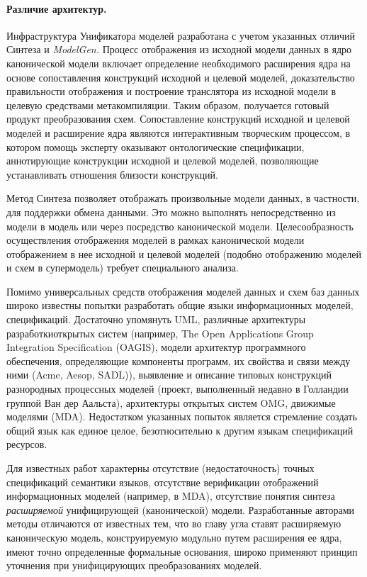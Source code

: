 \begin{multicols}{2}
\paragraph*{Различие архитектур.}Инфраструктура Унификатора моделей
разработана с учетом указанных отличий Синтеза и {\em ModelGen.}
Процесс отображения из исходной модели данных в ядро канонической
модели включает определение необходимого расширения ядра на основе
сопоставления конструкций исходной и целевой моделей, доказательство
правильности отображения и построение транслятора из исходной модели в
целевую средствами метакомпиляции. Таким образом, получается готовый
продукт преобразования схем. Сопоставление конструкций исходной и
целевой моделей и расширение ядра являются интерактивным творческим
процессом, в котором помощь эксперту оказывают онтологические
спецификации, аннотирующие конструкции исходной и целевой моделей,
позволяющие устанавливать отношения близости конструкций.

Метод Синтеза позволяет отображать произвольные модели данных, в
частности, для поддержки обмена данными. Это можно выполнять
непосредственно из модели в модель или через посредство канонической
модели. Целесообразность осуществления отображения моделей в рамках
канонической модели отображением в нее исходной и целевой моделей
(подобно отображению моделей и схем в супермодель) требует специального\linebreak
анализа.

Помимо универсальных средств отображения моделей данных и схем баз
данных широко известны попытки разработать общие языки информационных
моделей, спецификаций. Достаточно упомянуть UML, различные
архитектуры разработки\linebreak открытых систем (например, The Open
Applications Group Integration Specification (OAGIS), модели
архитектур программного обеспечения, опре\-де\-ля\-ющие компоненты программ,
их свойства и связи между ними (Acme, Aesop, SADL)), выявление и
описание типовых конструкций разнородных процессных моделей (проект,
выполненный недавно в Голландии группой Ван дер Аальста), архитектуры
открытых систем OMG, движимые моделями (MDA). Недостатком
указанных попыток является стремление создать общий язык как единое
целое, безотносительно к другим языкам спецификаций ресурсов.

Для известных работ характерны отсутствие (недостаточность) точных
спецификаций семантики языков, отсутствие верификации отображений
информационных моделей (например, в MDA), отсутствие понятия
синтеза {\it расширяемой} унифицирующей (канонической) модели.
Разработанные авторами методы отличаются от известных тем, что во
главу угла ставят расширяемую каноническую модель, конструируемую
модульно путем расширения ее ядра, имеют точно определенные формальные
основания, широко применяют принцип уточнения при унифицирующих
преобразованиях моделей.


\end{multicols}
